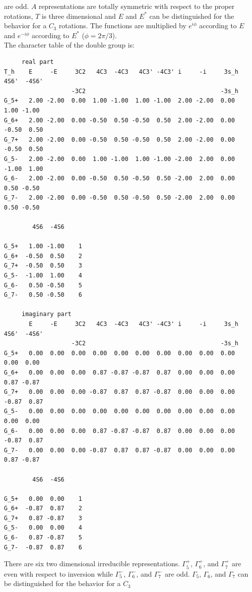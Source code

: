 \documentclass[12pt,a4paper]{article}
\begin{document}
are odd. $A$ representations are totally symmetric with respect to the proper 
rotations, $T$ is three dimensional and $E$ and $E^*$ can be distinguished for the 
behavior for a $C_3$ rotations. The functions are multiplied by
$e^{i\phi}$ according to $E$ and $e^{-i\phi}$ according to $E^*$
($\phi=2\pi/3$). \\
The character table of the double group is:
\begin{verbatim}
     real part
T_h    E     -E     3C2   4C3  -4C3   4C3' -4C3' i     -i     3s_h 4S6'  -4S6'
                   -3C2                                      -3s_h            
G_5+   2.00 -2.00  0.00  1.00 -1.00  1.00 -1.00  2.00 -2.00  0.00  1.00 -1.00
G_6+   2.00 -2.00  0.00 -0.50  0.50 -0.50  0.50  2.00 -2.00  0.00 -0.50  0.50
G_7+   2.00 -2.00  0.00 -0.50  0.50 -0.50  0.50  2.00 -2.00  0.00 -0.50  0.50
G_5-   2.00 -2.00  0.00  1.00 -1.00  1.00 -1.00 -2.00  2.00  0.00 -1.00  1.00
G_6-   2.00 -2.00  0.00 -0.50  0.50 -0.50  0.50 -2.00  2.00  0.00  0.50 -0.50
G_7-   2.00 -2.00  0.00 -0.50  0.50 -0.50  0.50 -2.00  2.00  0.00  0.50 -0.50

        4S6  -4S6 
                  
G_5+   1.00 -1.00    1
G_6+  -0.50  0.50    2
G_7+  -0.50  0.50    3
G_5-  -1.00  1.00    4
G_6-   0.50 -0.50    5
G_7-   0.50 -0.50    6

     imaginary part
       E     -E     3C2   4C3  -4C3   4C3' -4C3' i     -i     3s_h 4S6'  -4S6'
                   -3C2                                      -3s_h            
G_5+   0.00  0.00  0.00  0.00  0.00  0.00  0.00  0.00  0.00  0.00  0.00  0.00
G_6+   0.00  0.00  0.00  0.87 -0.87 -0.87  0.87  0.00  0.00  0.00  0.87 -0.87
G_7+   0.00  0.00  0.00 -0.87  0.87  0.87 -0.87  0.00  0.00  0.00 -0.87  0.87
G_5-   0.00  0.00  0.00  0.00  0.00  0.00  0.00  0.00  0.00  0.00  0.00  0.00
G_6-   0.00  0.00  0.00  0.87 -0.87 -0.87  0.87  0.00  0.00  0.00 -0.87  0.87
G_7-   0.00  0.00  0.00 -0.87  0.87  0.87 -0.87  0.00  0.00  0.00  0.87 -0.87

        4S6  -4S6 
                  
G_5+   0.00  0.00    1
G_6+  -0.87  0.87    2
G_7+   0.87 -0.87    3
G_5-   0.00  0.00    4
G_6-   0.87 -0.87    5
G_7-  -0.87  0.87    6
\end{verbatim}  
There are six two dimensional irreducible representations. $\Gamma_5^+$,
$\Gamma_6^+$, and $\Gamma_7^+$ are even with respect to inversion while
$\Gamma_5^-$, $\Gamma_6^-$, and $\Gamma_7^-$ are odd. $\Gamma_5$,
$\Gamma_6$, and $\Gamma_7$ can be distinguished for the behavior for a $C_3$ 
\end{document}
